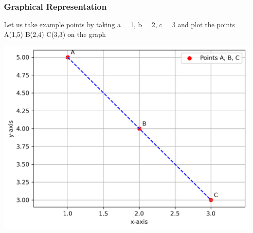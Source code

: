\documentclass{beamer}
\begin{document}
\begin{frame}
\frametitle{Graphical Representation}
Let us take example points by taking a = 1, b = 2, c = 3 and plot the points A(1,5) B(2,4) C(3,3) on the graph


\begin{center}
\includegraphics[width=0.6\linewidth]{fig1.png}
\end{center}
\end{frame}
\end{document}
